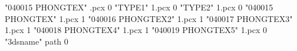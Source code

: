 "040015 PHONGTEX" \engine\textures\linier.pcx 0
"TYPE1" \engine\textures\atex1.pcx 0
"TYPE2" \engine\pic1.pcx 0
"040015 PHONGTEX" \engine\textures\atex1.pcx 1
"040016 PHONGTEX2" \engine\textures\atex1.pcx 1
"040017 PHONGTEX3" \engine\textures\atex1.pcx 1
"040018 PHONGTEX4" \engine\textures\atex1.pcx 1
"040019 PHONGTEX5" \engine\textures\atex1.pcx 0
"3dsname" path 0



